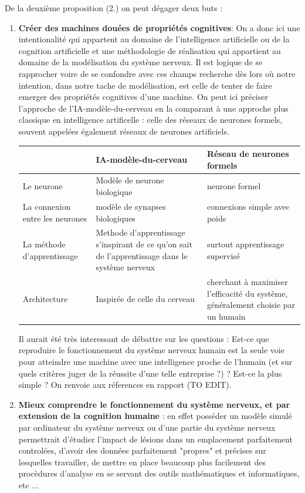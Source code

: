 \documentclass[12pt]{scrartcl}
\begin{document}
	De la deuxième proposition (2.) on peut dégager deux buts :  
		\begin{enumerate} \item \textbf{Créer des machines douées de propriétés cognitives}: On a donc ici une intentionalité qui appartent au domaine de l'intelligence artificielle ou de la cognition artificielle et une méthodologie de réalisation qui appartient au domaine de la modélisation du système nerveux. Il est logique de se rapprocher voire de se confondre avec ces champs recherche dès lors où notre intention, dans notre tache de modélisation, est celle de tenter de faire emerger des propriétés cognitives d'une machine. On peut ici préciser l'approche de l'IA-modèle-du-cerveau en la comparant à une approche plus classique en intelligence artificelle : celle des réseaux de neurones formels, souvent appelées également réseaux de neurones artificiels.  \begin{tabular}{|p{4cm}|p{5cm}|p{5cm}|} \hline&IA-modèle-du-cerveau & Réseau de neurones formels \\\hline Le neurone & Modèle de neurone biologique & neurone formel \\\hline La connexion entre les neurones & modèle de synapses biologiques & connexions simple avec poids \\\hline  La méthode d'apprentissage & Methode d'apprentissage s'inspirant de ce qu'on sait de l'apprentissage dans le système nerveux & surtout apprentissage supervisé \\\hline   Architecture & Inspirée de celle du cerveau & cherchant à maximiser l'efficacité du système, généralement choisie par un humain \\\hline \end{tabular}  Il aurait été très interessant de débattre sur les questions : Est-ce que reproduire le fonctionnement du système nerveux humain est la seule voie pour atteindre une machine avec une intelligence proche de l'humain (et sur quels critères juger de la réussite d'une telle entreprise ?) ? Est-ce la plus simple ? On renvoie aux réferences en rapport (TO EDIT).
		 \item \textbf{Mieux comprendre le fonctionnement du système nerveux, et par extension de la cognition humaine} : en effet posséder un modèle simulé par ordinateur du système nerveux ou d'une partie du système nerveux permettrait d'étudier l'impact de lésions dans un emplacement parfaitement controlées, d'avoir des données parfaitement "propres" et précises sur lesquelles travailler, de mettre en place beaucoup plus facilement des procèdures d'analyse en se servant des outils mathématiques et informatiques, etc ...

\end{enumerate}
\end{document}
